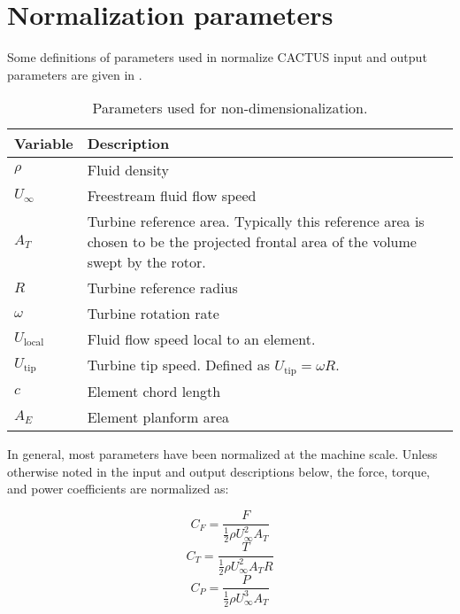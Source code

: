 \chapter{Normalization parameters}
Some definitions of parameters used in normalize CACTUS input and output parameters are given in .

\begin{table}[!htbp]
\centering
\caption{Parameters used for non-dimensionalization.}
\label{tbl:normalization_parameters}
\begin{tabular}{p{}p{}}
\toprule
Variable          & Description \\
\midrule
$\rho$            & Fluid density \\
$U_\infty$        & Freestream fluid flow speed \\
$A_T$             & Turbine reference area. Typically this reference area is chosen to be the projected frontal area of the volume swept by the rotor. \\
$R$               & Turbine reference radius \\
$\omega$          & Turbine rotation rate \\
$U_\textrm{local}$& Fluid flow speed local to an element. \\
$U_\textrm{tip}$  & Turbine tip speed. Defined as $U_\textrm{tip} = \omega R$. \\
$c$               & Element chord length \\
$A_E$             & Element planform area \\
\bottomrule
\end{tabular}
\end{table}

In general, most parameters have been normalized at the machine scale. Unless otherwise noted in the input and output descriptions below, the force, torque, and power coefficients are normalized as:

$$ C_F = \frac{F}{\frac{1}{2} \rho U_\infty^2 A_T} $$
$$ C_T = \frac{T}{\frac{1}{2} \rho U_\infty^2 A_T R} $$
$$ C_P = \frac{P}{\frac{1}{2} \rho U_\infty^3 A_T} $$